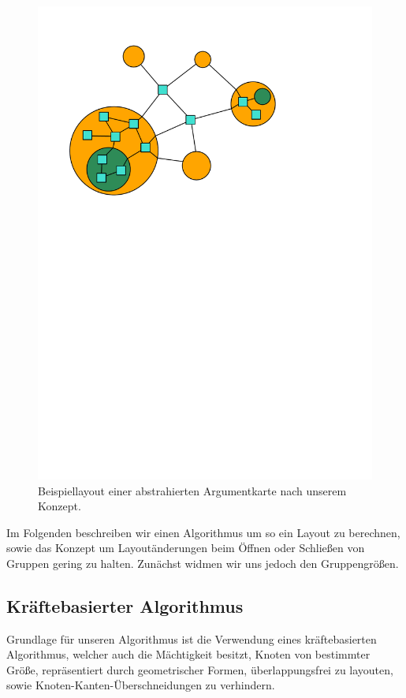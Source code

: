 \begin{figure}[h!]
\begin{center} 
  \includegraphics{Pics/Layoutbeispiel.pdf}
  \caption{Beispiellayout einer abstrahierten Argumentkarte nach unserem Konzept.}
  \label{f:Layoutbeispiel}
\end{center}
\end{figure}

Im Folgenden beschreiben wir einen Algorithmus um so ein Layout zu berechnen, 
sowie das Konzept um Layoutänderungen beim Öffnen oder Schließen von Gruppen gering zu halten.
Zunächst widmen wir uns jedoch den Gruppengrößen. 


\subsection*{Kräftebasierter Algorithmus}
Grundlage für unseren Algorithmus ist die Verwendung eines kräftebasierten Algorithmus, welcher auch die Mächtigkeit besitzt,
Knoten von bestimmter Größe, repräsentiert durch geometrischer Formen, überlappungsfrei zu layouten, sowie Knoten-Kanten-Überschneidungen zu verhindern.




